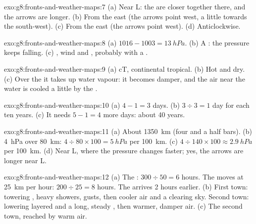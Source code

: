 \begin{solution}{exo:g8:fronts-and-weather-maps:7}
(a) Near L: the  are closer together there, and the arrows are
longer. (b) From the east (the arrows point west, a little towards the
south-west). (c) From the east (the arrows point west). (d)
Anticlockwise.
\end{solution}

\begin{solution}{exo:g8:fronts-and-weather-maps:8}
(a) $1016 - 1003 = \qty{13}{hPa}$. (b) A : the pressure keeps
falling. (c) , wind and , probably with a .
\end{solution}

\begin{solution}{exo:g8:fronts-and-weather-maps:9}
(a) cT, continental tropical. (b) Hot and dry. (c) Over the  it takes
up water vapour: it becomes damper, and the air near the water is cooled
a little by the .
\end{solution}

\begin{solution}{exo:g8:fronts-and-weather-maps:10}
(a) $4 - 1 = 3$ days. (b) $3 \div 3 = 1$ day for each ten years. (c) It
needs $5 - 1 = 4$ more days: about 40 years.
\end{solution}

\begin{solution}{exo:g8:fronts-and-weather-maps:11}
(a) About \qty{1350}{km} (four and a half  bars). (b) \qty{4}{hPa}
over \qty{80}{km}: $4 \div 80 \times 100 = \qty{5}{hPa}$ per
\qty{100}{km}. (c) $4 \div 140 \times 100 \approx \qty{2.9}{hPa}$ per
\qty{100}{km}. (d) Near L, where the pressure changes faster; yes, the
arrows are longer near L.
\end{solution}

\begin{solution}{exo:g8:fronts-and-weather-maps:12}
(a) The : $300 \div 50 = 6$ hours. The  moves at
\qty{25}{km} per hour: $200 \div 25 = 8$ hours. The  arrives
2 hours earlier. (b) First town: towering , heavy showers, gusts,
then cooler air and a clearing sky. Second town: lowering layered 
and a long, steady , then warmer, damper air. (c) The second town,
reached by warm air.
\end{solution}

